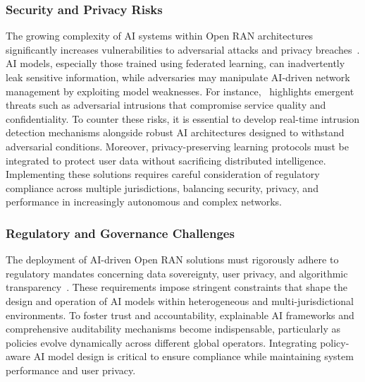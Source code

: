 \documentclass[sigconf]{acmart}
\begin{document}
\subsubsection{Security and Privacy Risks}
The growing complexity of AI systems within Open RAN architectures significantly increases vulnerabilities to adversarial attacks and privacy breaches~\cite{ref50,ref54}. AI models, especially those trained using federated learning, can inadvertently leak sensitive information, while adversaries may manipulate AI-driven network management by exploiting model weaknesses. For instance,~\cite{ref50} highlights emergent threats such as adversarial intrusions that compromise service quality and confidentiality. To counter these risks, it is essential to develop real-time intrusion detection mechanisms alongside robust AI architectures designed to withstand adversarial conditions. Moreover, privacy-preserving learning protocols must be integrated to protect user data without sacrificing distributed intelligence. Implementing these solutions requires careful consideration of regulatory compliance across multiple jurisdictions, balancing security, privacy, and performance in increasingly autonomous and complex networks.

\subsubsection{Regulatory and Governance Challenges}
The deployment of AI-driven Open RAN solutions must rigorously adhere to regulatory mandates concerning data sovereignty, user privacy, and algorithmic transparency~\cite{ref48,ref54}. These requirements impose stringent constraints that shape the design and operation of AI models within heterogeneous and multi-jurisdictional environments. To foster trust and accountability, explainable AI frameworks and comprehensive auditability mechanisms become indispensable, particularly as policies evolve dynamically across different global operators. Integrating policy-aware AI model design is critical to ensure compliance while maintaining system performance and user privacy.
\end{document}
